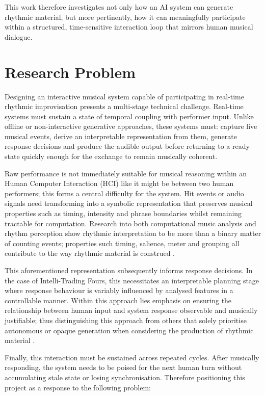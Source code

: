 This work therefore investigates not only how an AI system can generate
rhythmic material, but more pertinently, how it can meaningfully
participate within a structured, time-sensitive interaction loop that
mirrors human musical dialogue.

\section{Research Problem}\label{research-problem}

Designing an interactive musical system capable of participating in
real-time rhythmic improvisation presents a multi-stage technical
challenge. Real-time systems must sustain a state of temporal coupling
with performer input. Unlike offline or non-interactive generative
approaches, these systems must: capture live musical events, derive an
interpretable representation from them, generate response decisions and
produce the audible output before returning to a ready state quickly
enough for the exchange to remain musically coherent.

Raw performance is not immediately suitable for musical reasoning within
an Human Computer Interaction (HCI) like it might be between two human
performers; this forms a central difficulty for the system. Hit events
or audio signals need transforming into a symbolic representation that
preserves musical properties such as timing, intensity and phrase
boundaries whilst remaining tractable for computation. Research into
both computational music analysis and rhythm perception show rhythmic
interpretation to be more than a binary matter of counting events;
properties such timing, salience, meter and grouping all contribute to
the way rhythmic material is construed \citep{longuetHiggins1984rhythmic,temperley2009music,levitin2018psychology}.

This aforementioned representation subsequently informs response
decisions. In the case of Intelli-Trading Fours, this necessitates an
interpretable planning stage where response behaviour is variably
influenced by analysed features in a controllable manner. Within this
approach lies emphasis on ensuring the relationship between human input
and system response observable and musically justifiable; thus
distinguishing this approach from others that solely prioritise
autonomous or opaque generation when considering the production of
rhythmic material \citep{pachet2002continuator,pasquier2016introduction,smith2022humanai}.

Finally, this interaction must be sustained across repeated cycles.
After musically responding, the system needs to be poised for the next
human turn without accumulating stale state or losing synchronisation.
Therefore positioning this project as a response to the following
problem:

